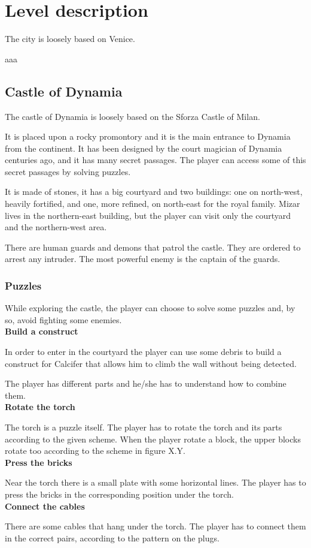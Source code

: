 \section{Level description}

The city is loosely based on Venice.

aaa

\subsection{Castle of Dynamia}
The castle of Dynamia is loosely based on the Sforza Castle of Milan.

It is placed upon a rocky promontory and it is the main entrance to Dynamia from the continent. It has been designed by the court magician of Dynamia centuries ago, and it has many secret passages. The player can access some of this secret passages by solving puzzles.

It is made of stones, it has a big courtyard and two buildings: one on north-west, heavily fortified, and one, more refined, on north-east for the royal family. Mizar lives in the northern-east building, but the player can visit only the courtyard and the northern-west area.

There are human guards and demons that patrol the castle. They are ordered to arrest any intruder. The most powerful enemy is the captain of the guards.

\subsubsection{Puzzles}
While exploring the castle, the player can choose to solve some puzzles and, by so, avoid fighting some enemies. \\

\textbf{Build a construct}

In order to enter in the courtyard the player can use some debris to build a construct for Calcifer that allows him to climb the wall without being detected.

The player has different parts and he/she has to understand how to combine them.\\

\textbf{Rotate the torch}

The torch is a puzzle itself. The player has to rotate the torch and its parts according to the given scheme. When the player rotate a block, the upper blocks rotate too according to the scheme in figure X.Y.\\

\textbf{Press the bricks}

Near the torch there is a small plate with some horizontal lines. The player has to press the bricks in the corresponding position under the torch.\\

\textbf{Connect the cables}

There are some cables that hang under the torch. The player has to connect them in the correct pairs, according to the pattern on the plugs.
